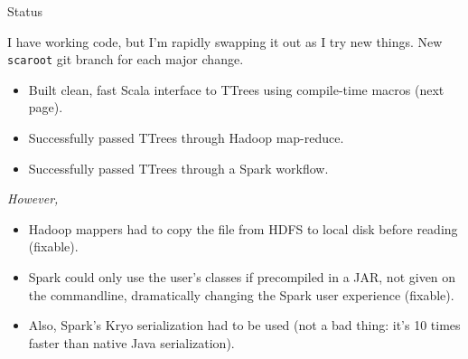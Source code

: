 \documentclass{beamer}
\begin{document}
\begin{frame}{Status}

\begin{block}{}
\vspace{-\baselineskip}
I have working code, but I'm rapidly swapping it out as I try new things. New {\tt scaroot} git branch for each major change.
\end{block}

\begin{itemize}
\item Built clean, fast Scala interface to TTrees using compile-time macros (next page).
\item Successfully passed TTrees through Hadoop map-reduce.
\item Successfully passed TTrees through a Spark workflow.
\end{itemize}

{\it However,}
\begin{itemize}
\item Hadoop mappers had to copy the file from HDFS to local disk before reading (fixable).
\item Spark could only use the user's classes if precompiled in a JAR, not given on the commandline, dramatically changing the Spark user experience (fixable).
\item Also, Spark's Kryo serialization had to be used (not a bad thing: it's 10 times faster than native Java serialization).
\end{itemize}
\end{frame}
\end{document}
